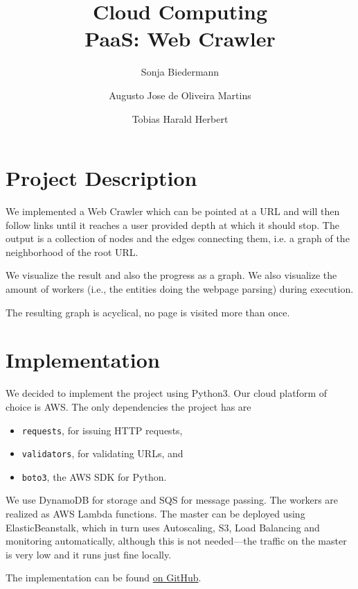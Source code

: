 \documentclass[english]{scrartcl}
\begin{document}
\title{Cloud Computing\\PaaS: Web Crawler}

\author{Sonja Biedermann \and Augusto Jose de Oliveira Martins \and Tobias Harald Herbert}

\maketitle
\tableofcontents

\section{Project Description}

We implemented a Web Crawler which can be pointed at a URL and will then follow
links until it reaches a user provided depth at which it should stop. The
output is a collection of nodes and the edges connecting them, i.e. a graph of
the neighborhood of the root URL.

We visualize the result and also the progress as a graph. We also visualize
the amount of workers (i.e., the entities doing the webpage parsing) during
execution.

The resulting graph is acyclical, no page is visited more than once.

\section{Implementation}

We decided to implement the project using Python3. Our cloud platform of choice
is AWS. The only dependencies the project has are

\begin{itemize}
    \item \texttt{requests}, for issuing HTTP requests,
    \item \texttt{validators}, for validating URLs, and
    \item \texttt{boto3}, the AWS SDK for Python.
\end{itemize}

We use DynamoDB for storage and SQS for message passing. The workers are
realized as AWS Lambda functions. The master can be deployed using
ElasticBeanstalk, which in turn uses Autoscaling, S3, Load Balancing and
monitoring automatically, although this is not needed---the traffic on the
master is very low and it runs just fine locally.

The implementation can be found \href{https://github.com/biederfrau/cloud-computing-paas}{on GitHub}.
\end{document}
